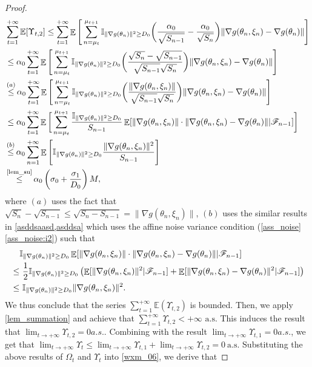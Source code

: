\documentclass[standalone]{article}
\newcommand{\I}{\mathbb{I}}
\DeclareMathOperator{\Expect}{\mathbb{E}}
\begin{document}
\begin{proof}
\begin{align*}
&\sum_{t=1}^{+\infty}\mathbb{E}[\Upsilon_{t,2}]\le \sum_{t=1}^{+\infty}\Expect\Bigg[\sum_{n=\mu_{t}}^{\mu_{t+1}}\I_{\|\nabla g(\theta_{n})\|^{2}\ge D_{0}}\bigg(\frac{\alpha_{0}}{\sqrt{S_{n-1}}}-\frac{\alpha_{0}}{\sqrt{S_{n}}}\bigg)\|\nabla g(\theta_{n},\xi_{n})-\nabla g(\theta_{n})\|\Bigg]\\&\le \alpha_{0}\sum_{t=1}^{+\infty}\Expect\Bigg[\sum_{n=\mu_{t}}^{\mu_{t+1}}\I_{\|\nabla g(\theta_{n})\|^{2}\ge D_{0}}\bigg(\frac{\sqrt{S_{n}}-\sqrt{S_{n-1}}}{\sqrt{S_{n-1}}\sqrt{S_{n}}}\bigg)\|\nabla g(\theta_{n},\xi_{n})-\nabla g(\theta_{n})\|\Bigg]\\&\mathop{\le}^{(a)}\alpha_{0}\sum_{t=1}^{+\infty}\Expect\Bigg[\sum_{n=\mu_{t}}^{\mu_{t+1}}\I_{\|\nabla g(\theta_{n})\|^{2}\ge D_{0}}\bigg(\frac{\|\nabla g(\theta_{n},\xi_{n})\|}{\sqrt{S_{n-1}}\sqrt{S_{n}}}\bigg)\|\nabla g(\theta_{n},\xi_{n})-\nabla g(\theta_{n})\|\Bigg]\\&\le \alpha_{0}\sum_{t=1}^{+\infty}\Expect\bigg[\sum_{n=\mu_{t}}^{\mu_{t+1}}\frac{\I_{\|\nabla g(\theta_{n})\|^{2}\ge D_{0}}}{S_{n-1}}\Expect[\|\nabla g(\theta_{n},\xi_{n})\|\cdot\|\nabla g(\theta_{n},\xi_{n})-\nabla g(\theta_{n})\||\mathscr{F}_{n-1}]\bigg]\\&\mathop{\le}^{(b)} \alpha_{0}\sum_{n=1}^{+\infty}\Expect\Bigg[\I_{\|\nabla g(\theta_{n})\|^{2}\ge D_{0}}\frac{\|\nabla g(\theta_{n},\xi_{n})\|^{2}}{S_{n-1}}\Bigg]\\&\mathop{\le}^{\text{\cref{lem_su}}}\alpha_{0} \left(\sigma_0 + \frac{\sigma_1}{D_0} \right)M,
\end{align*}
where $(a)$ uses the fact that $\sqrt{S_{n}}-\sqrt{S_{n-1}}\le \sqrt{S_{n}-S_{n-1}}=\|\nabla g(\theta_{n},\xi_{n})\|$, $(b)$ uses the similar results in \cref{asddsaasd,asddsa} which uses the affine noise variance condition  (\cref{ass_noise} \cref{ass_noise:i2}) such that \begin{align*}
& \I_{\|\nabla g(\theta_{n})\|^{2}\ge D_{0}}\Expect[\|\nabla g(\theta_{n},\xi_{n})\|\cdot\|\nabla g(\theta_{n},\xi_{n})-\nabla g(\theta_{n})\||\mathscr{F}_{n-1}]\\\le&\ \frac{1}{2}\I_{\|\nabla g(\theta_{n})\|^{2}\ge D_{0}}\left(\Expect[\|\nabla g(\theta_{n},\xi_{n})\|^{2}|\mathscr{F}_{n-1}]+\Expect[\|\nabla g(\theta_{n},\xi_{n})-\nabla g(\theta_{n})\|^{2}|\mathscr{F}_{n-1}] \right)\notag \\
\ \le&\ \I_{\|\nabla g(\theta_{n})\|^{2}\ge D_{0}}\|\nabla g(\theta_{n},\xi_{n})\|^{2}.
\end{align*}
We thus conclude that the series $\sum_{t=1}^{+\infty}\mathbb{E}(\Upsilon_{t,2})$ is bounded. Then, we apply \cref{lem_summation} and achieve that \(\sum_{t=1}^{+\infty}\Upsilon_{t,2} < +\infty \text{ a.s.}\) This induces the result that  \(\lim_{t \rightarrow +\infty} \Upsilon_{t,2} = 0 { a.s.}.\) Combining with the result $\lim_{t \rightarrow +\infty} \Upsilon_{t,1} = 0 { a.s.}$, we get that $\lim_{t\rightarrow+\infty}\Upsilon_{t}\le \lim_{t \rightarrow +\infty} \Upsilon_{t,1}+\lim_{t \rightarrow +\infty} \Upsilon_{t,2}=0\ \text{a.s.}$ Substituting the above results of $\Omega_t $ and $\Upsilon_{t}$ into  \cref{wxm_06}, we derive that

\end{proof}
\end{document}
